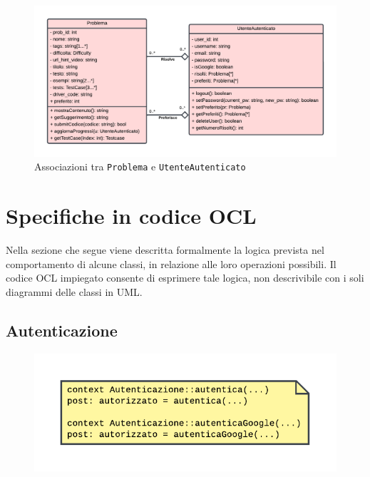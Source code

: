 \documentclass[11pt, a4paper]{article}
\theoremstyle{definition} %
\begin{document}
\begin{figure}[H]
\hspace*{-2.7cm}
\centering
\includegraphics[scale = 0.8]{materiale/class-profilo.pdf}
\caption{Associazioni tra \texttt{Problema} e \texttt{UtenteAutenticato}}
\label{profile}
\end{figure}




\newpage
\section{Specifiche in codice OCL}
Nella sezione che segue viene descritta formalmente la logica prevista
nel comportamento di alcune classi, in relazione alle loro operazioni
possibili. Il codice OCL impiegato consente di esprimere tale logica,
non descrivibile con i soli diagrammi delle classi in UML.


\subsection{Autenticazione}
\begin{figure}[H]
\centering
\includegraphics[scale = 0.9]{materiale/ocl-autenticazione.pdf}
\end{figure}
\end{document}

